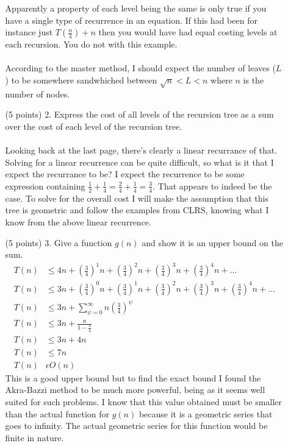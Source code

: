 \documentclass[paper=a4,fontsize=11pt]{article}
\begin{document}
\begin{enumerate}
\begin{enumerate}
Apparently a property of each level being the same is only true if you have a single type of recurrence in an equation. If this had been for instance just $T(\frac{n}{4}) + n$ then you would have had equal costing levels at each recursion. You do not with this example.\\\\
According to the master method, I should expect the number of leaves ($L$) to be somewhere sandwhiched between $\sqrt{n} < L < n$ where $n$ is the number of nodes.\\
\item [(5 points) 2.] Express the cost of all levels of the recursion tree as a sum over the cost of each level of the recursion tree.\\\\
Looking back at the last page, there's clearly a linear recurrance of that. Solving for a linear recurrence can be quite difficult, so what is it that I expect the recurrance to be? I expect the recurrence to be some expression containing $\frac{1}{2}+\frac{1}{4}=\frac{2}{4}+\frac{1}{4}=\frac{3}{4}$. That appears to indeed be the case. To solve for the overall cost I will make the assumption that this tree is geometric and follow the examples from CLRS, knowing what I know from the above linear recurrence.\\
\item [(5 points) 3.] Give a function $g (n)$ and show it is an upper bound on the sum.
\begin{align*}
T(n) &\leq 4n + (\frac{3}{4})^1n+(\frac{3}{4})^2n+(\frac{3}{4})^3n+(\frac{3}{4})^4n+\dots\\
T(n) &\leq 3n + (\frac{3}{4})^0n + (\frac{3}{4})^1n+(\frac{3}{4})^2n+(\frac{3}{4})^3n+(\frac{3}{4})^4n+\dots\\
T(n) &\leq 3n + \sum_{\psi=0}^{\infty}{n(\frac{3}{4})^\psi}\\
T(n) &\leq 3n + \frac{n}{1-\frac{3}{4}}\\
T(n) &\leq 3n + 4n\\
T(n) &\leq 7n\\
T(n) &\epsilon O(n)
\end{align*}
This is a good upper bound but to find the exact bound I found the Akra-Bazzi method to be much more powerful, being as it seems well suited for such problems. I know that this value obtained must be smaller than the actual function for $g(n)$ because it is a geometric series that goes to infinity. The actual geometric series for this function would be finite in nature.\\\\

\end{enumerate}
\end{enumerate}
\end{document}
